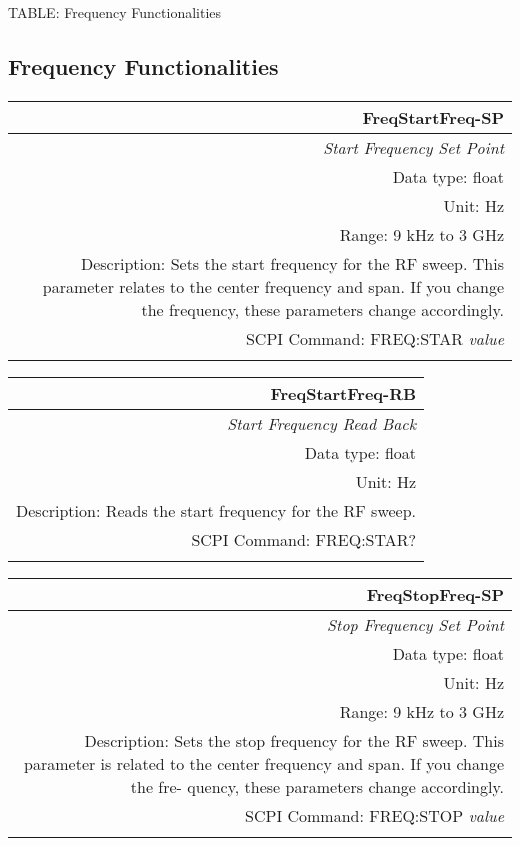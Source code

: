 \documentclass[openany]{article}
\begin{document}
	 TABLE: Frequency Functionalities
	\subsection{Frequency Functionalities}\label{pvgroup:function} %

	\paragraph{}

		\begin{tabular}{N}
			\hline
			\bfseries FreqStartFreq-SP \\ \hline
			\emph{Start Frequency Set Point} \\
			Data type: float \\
			Unit: Hz \\
			Range: 9 kHz to 3 GHz \\
			Description: Sets the start frequency for the RF sweep. This parameter relates to the center frequency and span. If you change the frequency, these parameters change accordingly. \\
			SCPI Command: FREQ:STAR \emph{value} \\
			\\
			
		\end{tabular}


		\begin{tabular}{N}
			\hline
			\bfseries FreqStartFreq-RB \\ \hline
			\emph{Start Frequency Read Back} \\
			Data type: float \\
			Unit: Hz \\
			Description: Reads the start frequency for the RF sweep. \\
			SCPI Command: FREQ:STAR? \\
			\\

		\end{tabular}


		\begin{tabular}{N}
			\hline
			\bfseries FreqStopFreq-SP \\ \hline
			\emph{Stop Frequency Set Point} \\
			Data type: float \\
			Unit: Hz \\
			Range: 9 kHz to 3 GHz \\
			Description: Sets the stop frequency for the RF sweep.
This parameter is related to the center frequency and span. If you change the fre-
quency, these parameters change accordingly. \\
			SCPI Command: FREQ:STOP \emph{value} \\
			\\
			
		\end{tabular}
\end{document}
